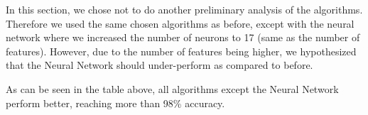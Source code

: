In this section, we chose not to do another preliminary analysis of the algorithms. Therefore we used the same chosen algorithms as before, except with the neural network where we increased the number of neurons to 17 (same as the number of features). However, due to the number of features being higher, we hypothesized that the Neural Network should under-perform as compared to before.
\begin{table}[!h]

    \vspace{0.2cm}
    \caption{Accuracy of the 4 selected algorithms on 4FG associated data.}
    \label{tab:selected_algs2}
\end{table}

As can be seen in the table above, all algorithms except the Neural Network perform better, reaching more than 98\% accuracy. 